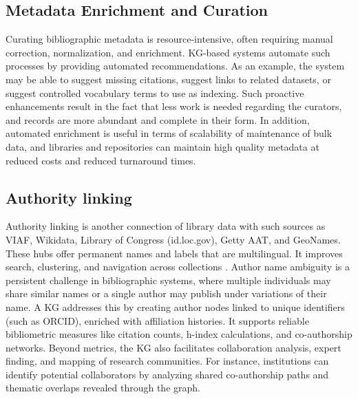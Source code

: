 \documentclass[12pt,a4paper]{article}
\begin{document}
\subsection{Metadata Enrichment and Curation}
Curating bibliographic metadata is resource-intensive, often requiring manual correction, normalization, and enrichment. KG-based systems automate such processes by providing automated recommendations. As an example, the system may be able to suggest missing citations, suggest links to related datasets, or suggest controlled vocabulary terms to use as indexing. Such proactive enhancements result in the fact that less work is needed regarding the curators, and records are more abundant and complete in their form. In addition, automated enrichment is useful in terms of scalability of maintenance of bulk data, and libraries and repositories can maintain high quality metadata at reduced costs and reduced turnaround times.

\subsection{Authority linking}
Authority linking is another connection of library data with such sources as VIAF, Wikidata, Library of Congress (id.loc.gov), Getty AAT, and GeoNames. These hubs offer permanent names and labels that are multilingual. It improves search, clustering, and navigation across collections \cite{auer2024orkg}. Author name ambiguity is a persistent challenge in bibliographic systems, where multiple individuals may share similar names or a single author may publish under variations of their name. A KG addresses this by creating author nodes linked to unique identifiers (such as ORCID), enriched with affiliation histories. It supports reliable bibliometric measures like citation counts, h-index calculations, and co-authorship networks. Beyond metrics, the KG also facilitates collaboration analysis, expert finding, and mapping of research communities. For instance, institutions can identify potential collaborators by analyzing shared co-authorship paths and thematic overlaps revealed through the graph.
\end{document}
